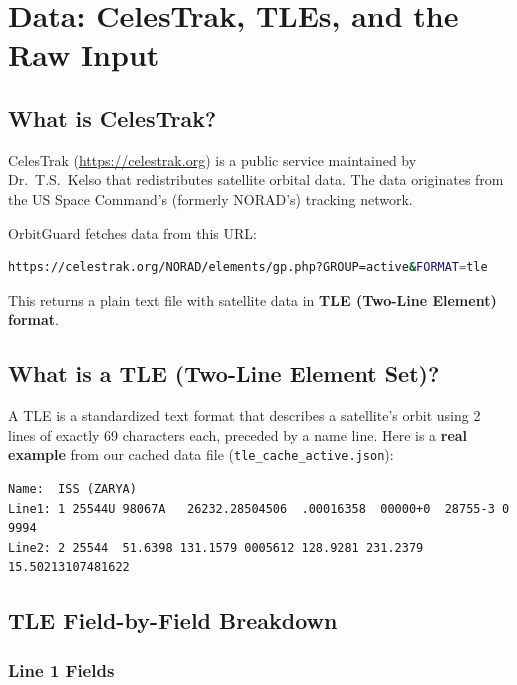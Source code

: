 \documentclass[12pt,a4paper]{article}
\begin{document}
\newpage
\section{Data: CelesTrak, TLEs, and the Raw Input}

\subsection{What is CelesTrak?}
CelesTrak (\url{https://celestrak.org}) is a public service maintained by Dr.\ T.S.\ Kelso that redistributes satellite orbital data. The data originates from the US Space Command's (formerly NORAD's) tracking network.

OrbitGuard fetches data from this URL:
\begin{lstlisting}[language=bash]
https://celestrak.org/NORAD/elements/gp.php?GROUP=active&FORMAT=tle
\end{lstlisting}

This returns a plain text file with satellite data in \textbf{TLE (Two-Line Element) format}.

\subsection{What is a TLE (Two-Line Element Set)?}
A TLE is a standardized text format that describes a satellite's orbit using 2 lines of exactly 69 characters each, preceded by a name line. Here is a \textbf{real example} from our cached data file (\texttt{tle\_cache\_active.json}):

\begin{realdatabox}[title=Real TLE Example: ISS (ZARYA)]
\begin{lstlisting}[language={}]
Name:  ISS (ZARYA)
Line1: 1 25544U 98067A   26232.28504506  .00016358  00000+0  28755-3 0  9994
Line2: 2 25544  51.6398 131.1579 0005612 128.9281 231.2379 15.50213107481622
\end{lstlisting}
\end{realdatabox}

\subsection{TLE Field-by-Field Breakdown}

\subsubsection{Line 1 Fields}
\end{document}
